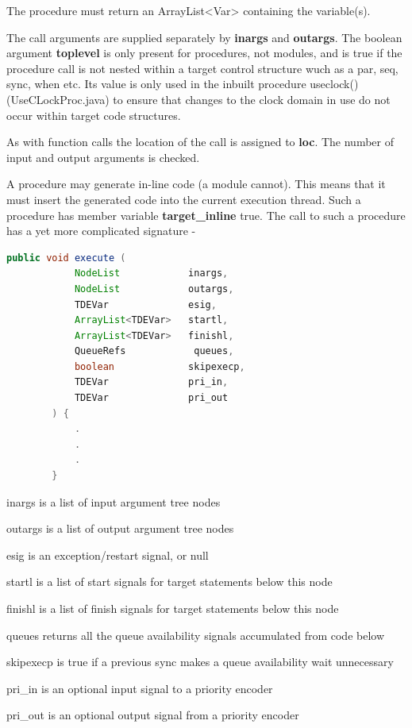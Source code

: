     The procedure must return an ArrayList<Var> containing the variable(s).

    The call arguments are supplied separately by {\bf inargs} and {\bf outargs}.
    The boolean argument {\bf toplevel} is only present for procedures, not
    modules, and is true if the procedure call is not nested within a
    target control structure wuch as a par{}, seq{}, sync{}, when{} etc.
    Its value is only used in the inbuilt procedure useclock() (UseCLockProc.java)
    to ensure that changes to the clock domain in use do not occur within target
    code structures.
    
    As with function calls the location of the call is assigned to {\bf loc}.
    The number of input and output arguments is checked.
    
    A procedure may generate in-line code (a module cannot). This means that it
    must insert the generated code into the current execution thread. Such a
    procedure has member variable {\bf target\_inline} true. The call to such a
    procedure has a yet more complicated signature -

    \begin{lstlisting}[gobble=4, language=java]
        public void execute (
            NodeList            inargs,
            NodeList            outargs,
            TDEVar              esig,
            ArrayList<TDEVar>   startl, 
            ArrayList<TDEVar>   finishl,
            QueueRefs            queues,
            boolean             skipexecp,
            TDEVar              pri_in,
            TDEVar              pri_out
        ) {
            .
            .
            .
        }
    \end{lstlisting}

    \blist
    \item inargs is a list of input argument tree nodes
    \item outargs is a list of output argument tree nodes
    \item esig is an exception/restart signal, or null
    \item startl is a list of start signals for target statements below this node
    \item finishl is a list of finish signals for target statements below this
            node
    \item queues returns all the queue availability signals accumulated from
            code below
    \item skipexecp is true if a previous sync makes a queue availability
            wait unnecessary
    \item pri\_in is an optional input signal to a priority encoder
    \item pri\_out is an optional output signal from a priority encoder
    \blend
    
